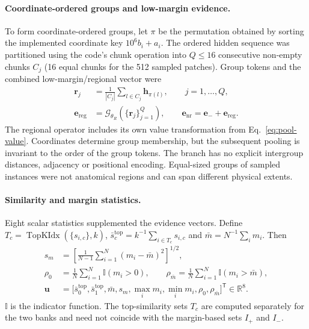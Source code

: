 \paragraph{Coordinate-ordered groups and low-margin evidence.}
To form coordinate-ordered groups, let $\pi$ be the permutation obtained by
sorting the implemented coordinate key $10^6b_i+a_i$. The ordered hidden
sequence was partitioned using the code's chunk operation into $Q\leq16$
consecutive non-empty chunks $C_j$ (16 equal chunks for the 512 sampled patches).
Group tokens and the combined low-margin/regional vector were
\begin{subequations}\label{eq:regional}
\begin{align}
 \mathbf{r}_j &= \frac{1}{|C_j|}\sum_{l\in C_j}\mathbf{h}_{\pi(l)},
        \qquad j=1,\ldots,Q,\\
 \mathbf{e}_{\mathrm{reg}} &=
       \mathcal{G}_{\theta_R}(\{\mathbf{r}_j\}_{j=1}^{Q}),
       \qquad \mathbf{e}_{\mathrm{nr}}=\mathbf{e}_{-}+\mathbf{e}_{\mathrm{reg}}.
\end{align}
\end{subequations}
The regional operator includes its own value transformation from
Eq.~\eqref{eq:pool-value}. Coordinates determine group membership, but the
subsequent pooling is invariant to the order of the group tokens. The branch
has no explicit intergroup distances, adjacency or positional encoding.
Equal-sized groups of sampled instances were not anatomical regions and can
span different physical extents.

\paragraph{Similarity and margin statistics.}
Eight scalar statistics supplemented the evidence vectors. Define
$T_c=\operatorname{TopKIdx}(\{s_{i,c}\},k)$,
$\bar{s}_{c}^{\mathrm{top}}=k^{-1}\sum_{i\in T_c}s_{i,c}$ and
$\bar{m}=N^{-1}\sum_i m_i$. Then
\begin{subequations}\label{eq:statistics}
\begin{align}
 s_m &= \left[\frac{1}{N-1}\sum_{i=1}^{N}(m_i-\bar m)^2\right]^{1/2},\\
 \rho_0 &= \frac{1}{N}\sum_{i=1}^{N}\mathbb{I}(m_i>0),\qquad
 \rho_{\bar m}=\frac{1}{N}\sum_{i=1}^{N}\mathbb{I}(m_i>\bar m),\\
 \mathbf{u} &= \bigl[\bar{s}_{0}^{\mathrm{top}},\bar{s}_{1}^{\mathrm{top}},
       \bar m,s_m,\max_i m_i,\min_i m_i,\rho_0,\rho_{\bar m}\bigr]^{\mathsf T}
       \in\mathbb{R}^{8}.
\end{align}
\end{subequations}
$\mathbb{I}$ is the indicator function. The top-similarity sets $T_c$ are computed
separately for the two banks and need not coincide with the margin-based sets
$I_{+}$ and $I_{-}$.

